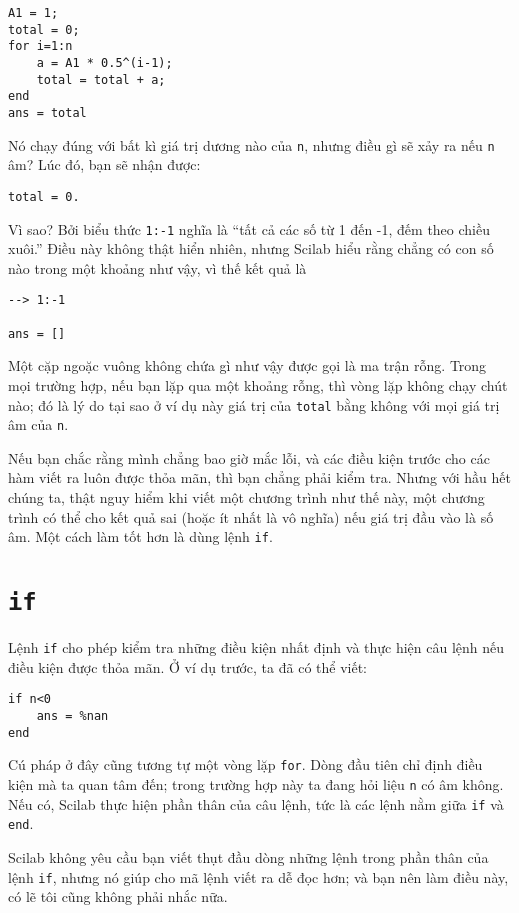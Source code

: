 \documentclass[12pt]{book}
\begin{document}
\begin{verbatim}
A1 = 1;
total = 0;
for i=1:n
    a = A1 * 0.5^(i-1);
    total = total + a;
end
ans = total
\end{verbatim}
%
Nó chạy đúng với bất kì giá trị dương nào của {\tt n}, nhưng
điều gì sẽ xảy ra nếu {\tt n} âm? Lúc đó, bạn sẽ nhận được:

\begin{verbatim}
total = 0.
\end{verbatim}

Vì sao? Bởi biểu thức {\tt 1:-1} nghĩa là ``tất cả các số từ
1 đến -1, đếm theo chiều xuôi.'' Điều này không thật hiển nhiên, 
nhưng Scilab hiểu rằng chẳng có con số nào trong một
khoảng như vậy, vì thế kết quả là

\begin{verbatim}
--> 1:-1

ans = []
\end{verbatim}
%
Một cặp ngoặc vuông không chứa gì như vậy được gọi là 
ma trận rỗng. Trong mọi trường hợp, nếu bạn lặp qua một
khoảng rỗng, thì vòng lặp không chạy chút nào; đó là lý do 
tại sao ở ví dụ này giá trị của {\tt total} bằng không với mọi
giá trị âm của {\tt n}.

Nếu bạn chắc rằng mình chẳng bao giờ mắc lỗi, và các 
điều kiện trước cho các hàm viết ra luôn được thỏa mãn, thì bạn
chẳng phải kiểm tra. Nhưng với hầu hết chúng ta, thật nguy hiểm
khi viết một chương trình như thế này, một chương trình có thể
cho kết quả sai (hoặc ít nhất là vô nghĩa) nếu giá trị đầu vào
là số âm. Một cách làm tốt hơn là dùng lệnh {\tt if}.


\section{{\tt if}}

Lệnh {\tt if} cho phép kiểm tra những điều kiện nhất định và
thực hiện câu lệnh nếu điều kiện được thỏa mãn. Ở ví dụ trước,
ta đã có thể viết:

\begin{verbatim}
if n<0
    ans = %nan
end
\end{verbatim}
%
Cú pháp ở đây cũng tương tự một vòng lặp {\tt for}. Dòng đầu tiên
chỉ định điều kiện mà ta quan tâm đến; trong trường hợp này
ta đang hỏi liệu {\tt n} có âm không.  Nếu có, Scilab thực hiện
phần thân của câu lệnh, tức là các lệnh nằm giữa 
{\tt if} và {\tt end}.

Scilab không yêu cầu bạn viết thụt đầu dòng những lệnh trong
phần thân của lệnh {\tt if}, nhưng nó giúp cho mã lệnh viết ra 
dễ đọc hơn; và bạn nên làm điều này, có lẽ tôi cũng không phải
nhắc nữa.
\end{document}
